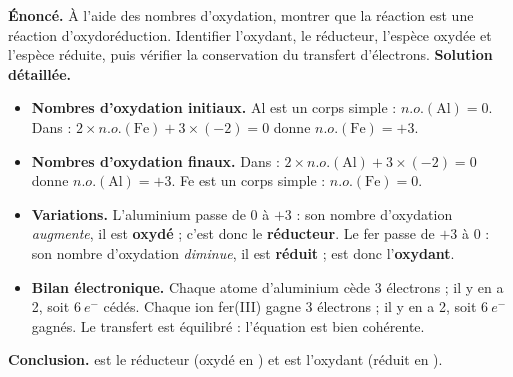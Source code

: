 \documentclass[11pt]{article}
\begin{document}
\begin{exoresolu}
\textbf{Énoncé.} À l'aide des nombres d'oxydation, montrer que la réaction  est une réaction d'oxydoréduction. Identifier l'oxydant, le réducteur, l'espèce oxydée et l'espèce réduite, puis vérifier la conservation du transfert d'électrons.
\tcblower
\textbf{Solution détaillée.}
\begin{itemize}
\item \textbf{Nombres d'oxydation initiaux.} Al est un corps simple : $n.o.(\text{Al}) = 0$. Dans  : $2 \times n.o.(\text{Fe}) + 3 \times (-2) = 0$ donne $n.o.(\text{Fe}) = +3$.
\item \textbf{Nombres d'oxydation finaux.} Dans  : $2 \times n.o.(\text{Al}) + 3 \times (-2) = 0$ donne $n.o.(\text{Al}) = +3$. Fe est un corps simple : $n.o.(\text{Fe}) = 0$.
\item \textbf{Variations.} L'aluminium passe de $0$ à $+3$ : son nombre d'oxydation \emph{augmente}, il est \textbf{oxydé} ; c'est donc le \textbf{réducteur}. Le fer passe de $+3$ à $0$ : son nombre d'oxydation \emph{diminue}, il est \textbf{réduit} ;  est donc l'\textbf{oxydant}.
\item \textbf{Bilan électronique.} Chaque atome d'aluminium cède 3 électrons ; il y en a 2, soit $6\ e^-$ cédés. Chaque ion fer(III) gagne 3 électrons ; il y en a 2, soit $6\ e^-$ gagnés. Le transfert est équilibré : l'équation est bien cohérente.
\end{itemize}
\textbf{Conclusion.}  est le réducteur (oxydé en ) et  est l'oxydant (réduit en ).
\end{exoresolu}
\end{document}
